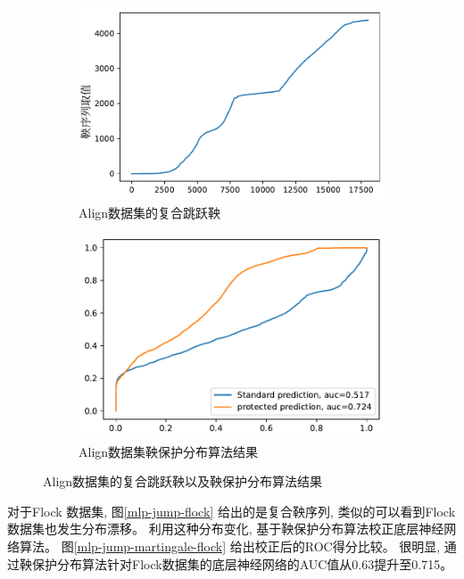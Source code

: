 \begin{figure}
     \centering
     \begin{subfigure}[b]{.45\textwidth}
         \centering
         \includegraphics[width=1\textwidth]{Img/chapter11/align-martingale-MLPClassifier}   
         \caption{Align数据集的复合跳跃鞅}
         \label{mlp-jump}
     \end{subfigure}
     \hfill
     \begin{subfigure}[b]{.45\textwidth}
         \centering
         \includegraphics[width=1\textwidth]{Img/chapter11/align-MLPClassifier}
         \caption{Align数据集鞅保护分布算法结果}
         \label{mlp-jump-martingale-align}
     \end{subfigure}
\caption{Align数据集的复合跳跃鞅以及鞅保护分布算法结果}
\label{fig:align}
\end{figure}

对于Flock 数据集, 图\ref{mlp-jump-flock} 给出的是复合鞅序列, 类似的可以看到Flock数据集也发生分布漂移。 利用这种分布变化, 基于鞅保护分布算法校正底层神经网络算法。 图\ref{mlp-jump-martingale-flock} 给出校正后的ROC得分比较。 很明显, 通过鞅保护分布算法针对Flock数据集的底层神经网络的AUC值从0.63提升至0.715。 

